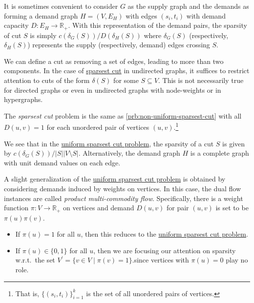 It is sometimes convenient to consider \(G\) as the supply graph and the demands as forming a demand graph \(H = (V, E_H)\) with edges \((s_i, t_i)\) with demand capacity \(D\colon E_H \to \mathbb{R} _+\). With this representation of the demand pairs, the sparsity of cut \(S\) is simply \(c(\delta _G(S)) / D(\delta _H(S))\) where \(\delta _G(S)\) (respectively, \(\delta _H(S)\)) represents the supply (respectively, demand) edges crossing \(S\).

\begin{remark}
	We can define a cut as removing a set of edges, leading to more than two components. In the case of \hyperref[prb:non-uniform-sparsest-cut]{sparsest cut} in undirected graphs, it suffices to restrict attention to cuts of the form \(\delta (S)\) for some \(S \subseteq V\). This is not necessarily true for directed graphs or even in undirected graphs with node-weights or in hypergraphs.
\end{remark}

\begin{problem}\label{prb:sparsest-cut}
The \emph{sparsest cut} problem is the same as \autoref{prb:non-uniform-sparsest-cut} with all \(D(u, v) = 1\) for each unordered pair of vertices \((u, v)\).\footnote{That is, \(\{ (s_i, t_i) \} _{i=1}^{k}\) is the set of all unordered pairs of vertices.}
\end{problem}

We see that in the \hyperref[prb:sparsest-cut]{uniform sparsest cut problem}, the sparsity of a cut \(S\) is given by \(c(\delta _G(S)) / \lvert S \rvert \lvert V \setminus S \rvert \). Alternatively, the demand graph \(H\) is a complete graph with unit demand values on each edge.

\begin{note}
	A slight generalization of the \hyperref[prb:sparsest-cut]{uniform sparsest cut problem} is obtained by considering demands induced by weights on vertices. In this case, the dual flow instances are called \emph{product multi-commodity flow}. Specifically, there is a weight function \(\pi \colon V \to \mathbb{R} _+\) on vertices and demand \(D(u, v)\) for pair \((u, v)\) is set to be \(\pi (u) \pi (v)\).
	\begin{itemize}
		\item If \(\pi (u) = 1\) for all \(u\), then this reduces to the \hyperref[prb:sparsest-cut]{uniform sparsest cut problem}.
		\item If \(\pi (u) \in \{ 0, 1 \} \) for all \(u\), then we are focusing our attention on sparsity w.r.t.\ the set \(V^{\prime} = \{ v \in V \mid \pi (v) = 1 \} \).since vertices with \(\pi (u) = 0\) play no role.
	\end{itemize}
\end{note}

